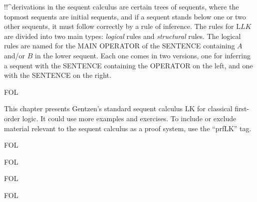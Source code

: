\documentclass[10pt,a4paper]{article}
\newcommand*{\olup}[1]{\MakeUppercase{#1}}
\theoremstyle{plain}
\theoremstyle{definition}
\theoremstyle{remark}
\newenvironment{editorial}{}{}
\newcommand*{\olchapter}[3]{}
\newcommand*{\olimport}[1]{}
\providecommand{\Log}{\ensuremath{\mathrm{L}}}
\providecommand{\iftag}[1]{#1}
\providecommand{\iftag}{}
\begin{document}
!!^{derivation}s in the sequent calculus are certain trees of
sequents, where the topmost sequents are initial sequents, and if a
sequent stands below one or two other sequents, it must follow
correctly by a rule of inference.  The rules for $\Log{LK}$ are
divided into two main types: \emph{logical} rules and
\emph{structural} rules.  The logical rules are named for the \olup{main
  operator} of the \olup{sentence} containing $A$ and/or $B$ in the
lower sequent. Each one comes in two versions, one for inferring a
sequent with the \olup{sentence} containing the \olup{operator} on the left,
and one with the \olup{sentence} on the right.





\iftag{FOL}
      {\olchapter{fol}{seq}{The Sequent Calculus}}
      {\olchapter{pl}{seq}{The Sequent Calculus}}

\begin{editorial}
  This chapter presents Gentzen's standard sequent calculus LK for
  classical first-order logic.  It could use more examples and
  exercises. To include or exclude material relevant to the sequent
  calculus as a proof system, use the ``prfLK'' tag.
\end{editorial}

\olimport{rules-and-proofs}

\olimport{propositional-rules}

\iftag{FOL}{%
  \olimport{quantifier-rules}
}{}

\olimport{structural-rules}

\olimport{derivations}

\olimport{proving-things}

\iftag{FOL}{%
  \olimport{proving-things-quant}
}{}

\olimport{proof-theoretic-notions}

\olimport{provability-consistency}

\olimport{provability-propositional}

\iftag{FOL}{%
  \olimport{provability-quantifiers}
}{}

\olimport{soundness}

\iftag{FOL}{%
  \olimport{identity}
  \olimport{soundness-identity}
}{}

\OLEndChapterHook


\end{document}
